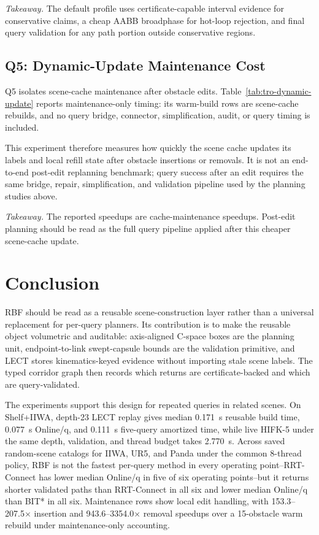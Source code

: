 \documentclass[journal]{IEEEtran}
\DeclareRobustCommand{\textsc}[1]{\textnormal{\MakeUppercase{#1}}}
\newcommand{\rbf}{\textsc{RBF}}
\newcommand{\cspace}{\mbox{C-space}}
\newcommand{\onlineq}{\mbox{Online/q}}
\begin{document}
\noindent\emph{Takeaway.}
The default profile uses certificate-capable interval evidence for conservative
claims, a cheap AABB broadphase for hot-loop rejection, and final query
validation for any path portion outside conservative regions.

\subsection{Q5: Dynamic-Update Maintenance Cost}
\label{sec:exp_dynamic_updates}

Q5 isolates scene-cache maintenance after obstacle edits. Table~\ref{tab:tro-dynamic-update}
reports maintenance-only timing: its warm-build rows are scene-cache rebuilds,
and no query bridge, connector, simplification, audit, or query timing is
included.

This experiment therefore measures how quickly the scene cache updates its
labels and local refill state after obstacle insertions or removals. It is not
an end-to-end post-edit replanning benchmark; query success after an edit
requires the same bridge, repair, simplification, and validation pipeline used
by the planning studies above.

\noindent\emph{Takeaway.}
The reported speedups are cache-maintenance speedups. Post-edit planning should
be read as the full query pipeline applied after this cheaper scene-cache update.

\section{Conclusion}\label{sec:conclusion}

\rbf{} should be read as a reusable scene-construction layer rather than a
universal replacement for per-query planners. Its contribution is to make the
reusable object volumetric and auditable: axis-aligned \cspace{} boxes are
the planning unit, endpoint-to-link swept-capsule bounds are the validation primitive, and
LECT stores kinematics-keyed evidence without importing stale scene labels. The
typed corridor graph then records which returns are certificate-backed and which
are query-validated.

The experiments support this design for repeated queries in related scenes. On
Shelf+IIWA, depth-23 LECT replay gives median 0.171~s reusable build time,
0.077~s \onlineq{}, and 0.111~s five-query amortized time, while live
\mbox{HIFK-5} under the same depth, validation, and thread budget takes
2.770~s. Across saved random-scene catalogs for IIWA, UR5, and Panda under the
common 8-thread policy, \rbf{} is not the fastest
per-query method in every operating point--\mbox{RRT-Connect} has lower median
\onlineq{} in five of six operating points--but it returns shorter validated
paths than \mbox{RRT-Connect} in all six and lower median \onlineq{} than BIT*
in all six.
Maintenance rows show local edit handling, with 153.3--207.5$\times$ insertion
and 943.6--3354.0$\times$ removal speedups over a 15-obstacle warm rebuild
under maintenance-only accounting.
\end{document}
